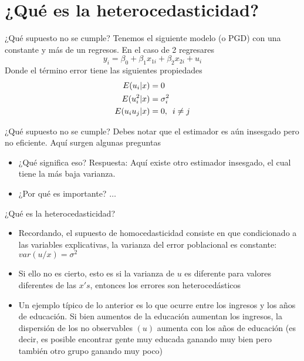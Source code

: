 \section[¿Qué es?]{¿Qué es la heterocedasticidad?}

\begin{frame}{¿Qué supuesto no se cumple?}
	Tenemos el siguiente modelo (o PGD) con una constante y más de un regresos. En el caso de 2 regresares
			$$y_i = \beta_0+\beta_1x_{1i}+\beta_2x_{2i} + u_i$$
	Donde el término error tiene las siguientes propiedades
			\begin{align*}
				E(u_i|x) & = 0 \\
				E(u_{i}^{2}|x) & = \sigma_{i}^{2}\\
				E(u_{i}u_{j}|x) & = 0, \enskip i \neq j
			\end{align*}
\end{frame}
\begin{frame}{¿Qué supuesto no se cumple?}
	Debes notar que el estimador es aún insesgado pero no eficiente. Aquí surgen algunas preguntas
	\begin{itemize}
		\item ¿Qué significa eso? Respuesta: Aquí existe otro estimador insesgado, el cual tiene la más baja varianza.
		\item ¿Por qué es importante? $\ldots$
	\end{itemize}
\end{frame}
\begin{frame}{¿Qué es la heterocedasticidad?}
	\begin{itemize}
		\item Recordando, el supuesto de homocedasticidad consiste en que condicionado a las variables explicativas, la varianza del error poblacional es constante: $var(u/x)=\sigma^{2}$
		\pause
		\item Si ello no es cierto, esto es si la varianza de $u$ es diferente para valores diferentes de las $x's$, entonces los errores son heterocedásticos
		\pause
		\item Un ejemplo típico de lo anterior es lo que ocurre entre los ingresos y los años de educación. Si bien aumentos de la educación aumentan los ingresos, la dispersión de los no observables $(u)$ aumenta con los años de educación (es decir, es posible encontrar gente muy educada ganando muy bien pero también otro grupo ganando muy poco)
	\end{itemize}
\end{frame}
